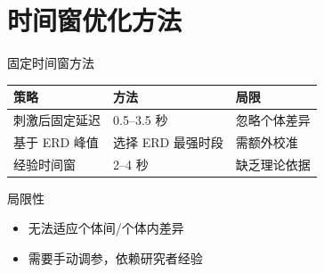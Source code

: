 \section{时间窗优化方法}

\begin{frame}{固定时间窗方法}
    \begin{table}[h]
        \centering
        \footnotesize
        \begin{tabular}{l|l|l}
            \hline
            \textbf{策略} & \textbf{方法} & \textbf{局限} \\
            \hline
            刺激后固定延迟 & 0.5--3.5 秒 & 忽略个体差异 \\
            \hline
            基于 ERD 峰值 & 选择 ERD 最强时段 & 需额外校准 \\
            \hline
            经验时间窗 & 2--4 秒 & 缺乏理论依据 \\
            \hline
        \end{tabular}
    \end{table}
    
    \vspace{0.5cm}
    \begin{alertblock}{局限性}
        \begin{itemize}
            \item 无法适应个体间/个体内差异
            \item 需要手动调参，依赖研究者经验
        \end{itemize}
    \end{alertblock}
\end{frame}

